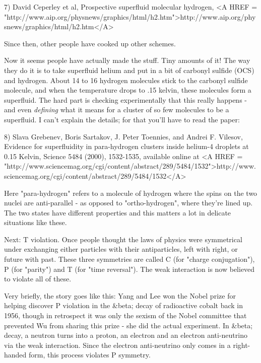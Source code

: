 7) David Ceperley et al, Prospective superfluid molecular hydrogen, 
<A HREF = "http://www.aip.org/physnews/graphics/html/h2.htm">http://www.aip.org/physnews/graphics/html/h2.htm</A>

Since then, other people have cooked up other schemes.  

Now it seems people have actually made the stuff.  Tiny amounts of it!  
The way they do it is to take superfluid helium and put in a bit of 
carbonyl sulfide (OCS) and hydrogen.  About 14 to 16 hydrogen molecules 
stick to the carbonyl sulfide molecule, and when the temperature drops 
to .15 kelvin, these molecules form a superfluid.  The hard part is 
checking experimentally that this really happens - and even \emph{defining}
what it means for a cluster of so few molecules to be a superfluid.   
I can't explain the details; for that you'll have to read the paper:

8) Slava Grebenev, Boris Sartakov, J. Peter Toennies, and 
Andrei F. Vilesov, Evidence for superfluidity in para-hydrogen 
clusters inside helium-4 droplets at 0.15 Kelvin, Science 5484 
(2000), 1532-1535, available online at 
<A HREF = "http://www.sciencemag.org/cgi/content/abstract/289/5484/1532">http://www.sciencemag.org/cgi/content/abstract/289/5484/1532</A>

Here "para-hydrogen" refers to a molecule of hydrogen where the spins 
on the two nuclei are anti-parallel - as opposed to "ortho-hydrogen",
where they're lined up.  The two states have different properties and
this matters a lot in delicate situations like these.

Next: T violation.  Once people thought the laws of physics
were symmetrical under exchanging either particles with their
antiparticles, left with right, or future with past.  These three 
symmetries are called C (for "charge conjugation"), P (for "parity") 
and T (for "time reversal").  The weak interaction is now believed
to violate all of these.   

Very briefly, the story goes like this: Yang and Lee won the Nobel 
prize for helping discover P violation in the &beta; decay of radioactive
cobalt back in 1956, though in retrospect it was only the sexism 
of the Nobel committee that prevented Wu from sharing this prize - 
she did the actual experiment.   In &beta; decay, a neutron turns into
a proton, an electron and an electron anti-neutrino via the weak
interaction.  Since the electron anti-neutrino only comes in a
right-handed form, this process violates P symmetry.

